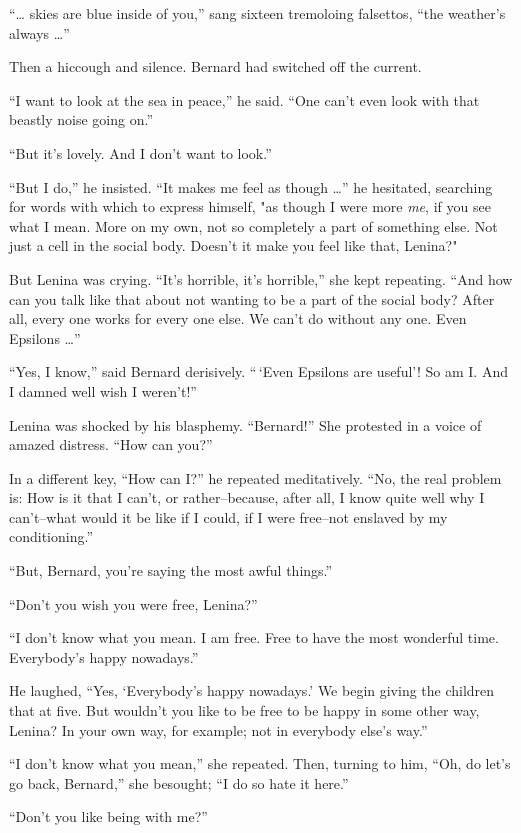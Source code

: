 \documentclass[12pt]{report}
\begin{document}
``\ldots{} skies are blue inside of you,'' sang sixteen tremoloing
falsettos, ``the weather's always \ldots{}''

Then a hiccough and silence. Bernard had switched off the current.

``I want to look at the sea in peace,'' he said. ``One can't even look
with that beastly noise going on.''

``But it's lovely. And I don't want to look.''

``But I do,'' he insisted. ``It makes me feel as though \ldots{}'' he
hesitated, searching for words with which to express himself, "as though
I were more \emph{me}, if you see what I mean. More on my own, not so
completely a part of something else. Not just a cell in the social body.
Doesn't it make you feel like that, Lenina?"

But Lenina was crying. ``It's horrible, it's horrible,'' she kept
repeating. ``And how can you talk like that about not wanting to be a
part of the social body? After all, every one works for every one else.
We can't do without any one. Even Epsilons \ldots{}''

``Yes, I know,'' said Bernard derisively. ``\,`Even Epsilons are
useful'! So am I. And I damned well wish I weren't!''

Lenina was shocked by his blasphemy. ``Bernard!'' She protested in a
voice of amazed distress. ``How can you?''

In a different key, ``How can I?'' he repeated meditatively. ``No, the
real problem is: How is it that I can't, or rather--because, after all,
I know quite well why I can't--what would it be like if I could, if I
were free--not enslaved by my conditioning.''

``But, Bernard, you're saying the most awful things.''

``Don't you wish you were free, Lenina?''

``I don't know what you mean. I am free. Free to have the most wonderful
time. Everybody's happy nowadays.''

He laughed, ``Yes, `Everybody's happy nowadays.' We begin giving the
children that at five. But wouldn't you like to be free to be happy in
some other way, Lenina? In your own way, for example; not in everybody
else's way.''

``I don't know what you mean,'' she repeated. Then, turning to him,
``Oh, do let's go back, Bernard,'' she besought; ``I do so hate it
here.''

``Don't you like being with me?''
\end{document}
